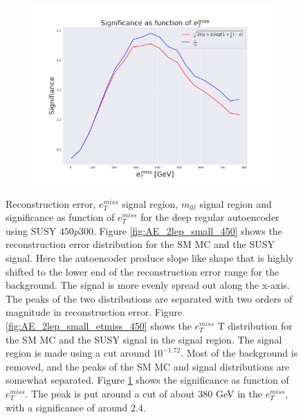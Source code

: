 \begin{figure}[H]
    \hfill  
    \begin{subfigure}{.50\textwidth}
        \includegraphics[width=\textwidth]{Figures/AE_testing/small/2lep/significance_etmiss_450p0p0300_-1.7167506533614734.pdf}
        \caption{}
        \label{fig:AE_2lep_small_signi_450}
    \end{subfigure}
    \hfill      
    \caption[2lep shallow network | $450p300$ | AE]{Reconstruction error, $e_T^{miss}$ signal region, $m_{lll}$ signal region and significance as function of 
    $e_T^{miss}$ for the deep regular autoencoder using SUSY $450p300$. 
    Figure \ref{fig:AE_2lep_small_450} shows the reconstruction error distribution for the SM MC and the SUSY signal. 
Here the autoencoder produce slope like shape that is highly shifted to the lower end of the reconstruction error range
for the background. The signal is more evenly spread out along the x-axis. The peaks of the two distributions are separated
with two orders of magnitude in reconstruction error. Figure \ref{fig:AE_2lep_small_etmiss_450} shows the $e_T^{miss}$
T distribution for the SM MC and the SUSY signal in the signal region. The signal region is made using a cut around
$10^{-1.72}$. Most of the background is removed, and the peaks of the SM MC and signal distributions are
somewhat separated.  Figure \ref{fig:AE_2lep_small_signi_450} shows the significance as function of $e_T^{miss}$. The peak is put 
around a cut of about 380 GeV in the $e_T^{miss}$, with a significance of around $2.4$.}
    \label{fig:AE_2lep_small_rec_sig_signi_450}
\end{figure}


